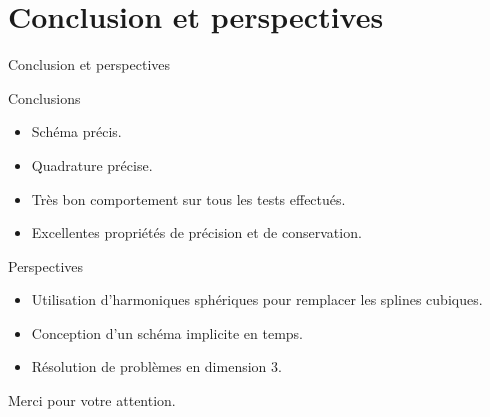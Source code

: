 \documentclass[11pt]{beamer}
\begin{document}
\section{Conclusion et perspectives}
\begin{frame}{Conclusion et perspectives}
\begin{block}{Conclusions}
\begin{itemize}
\item Schéma précis.
\item Quadrature précise.
\item Très bon comportement sur tous les tests effectués.
\item Excellentes propriétés de précision et de conservation.
\end{itemize}
\end{block}

\begin{block}{Perspectives}
\begin{itemize}
\item Utilisation d'harmoniques sphériques pour remplacer les splines cubiques.
\item Conception d'un schéma implicite en temps.
\item Résolution de problèmes en dimension 3.
\end{itemize}
\end{block}
\end{frame}


\begin{frame}
\begin{center}
Merci pour votre attention.
\end{center}
\end{frame}
\end{document}
